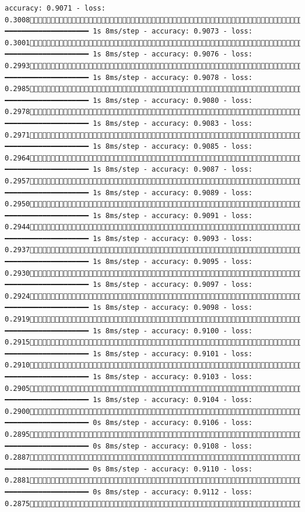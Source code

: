 \documentclass[
  letterpaper,
  DIV=11,
  numbers=noendperiod]{scrreprt}
\begin{document}
\begin{verbatim}
accuracy: 0.9071 - loss: 0.30081642/1875 ━━━━━━━━━━━━━━━━━━━━ 1s 8ms/step - accuracy: 0.9073 - loss: 0.30011650/1875 ━━━━━━━━━━━━━━━━━━━━ 1s 8ms/step - accuracy: 0.9076 - loss: 0.29931658/1875 ━━━━━━━━━━━━━━━━━━━━ 1s 8ms/step - accuracy: 0.9078 - loss: 0.29851665/1875 ━━━━━━━━━━━━━━━━━━━━ 1s 8ms/step - accuracy: 0.9080 - loss: 0.29781673/1875 ━━━━━━━━━━━━━━━━━━━━ 1s 8ms/step - accuracy: 0.9083 - loss: 0.29711680/1875 ━━━━━━━━━━━━━━━━━━━━ 1s 8ms/step - accuracy: 0.9085 - loss: 0.29641687/1875 ━━━━━━━━━━━━━━━━━━━━ 1s 8ms/step - accuracy: 0.9087 - loss: 0.29571694/1875 ━━━━━━━━━━━━━━━━━━━━ 1s 8ms/step - accuracy: 0.9089 - loss: 0.29501701/1875 ━━━━━━━━━━━━━━━━━━━━ 1s 8ms/step - accuracy: 0.9091 - loss: 0.29441708/1875 ━━━━━━━━━━━━━━━━━━━━ 1s 8ms/step - accuracy: 0.9093 - loss: 0.29371715/1875 ━━━━━━━━━━━━━━━━━━━━ 1s 8ms/step - accuracy: 0.9095 - loss: 0.29301722/1875 ━━━━━━━━━━━━━━━━━━━━ 1s 8ms/step - accuracy: 0.9097 - loss: 0.29241727/1875 ━━━━━━━━━━━━━━━━━━━━ 1s 8ms/step - accuracy: 0.9098 - loss: 0.29191732/1875 ━━━━━━━━━━━━━━━━━━━━ 1s 8ms/step - accuracy: 0.9100 - loss: 0.29151737/1875 ━━━━━━━━━━━━━━━━━━━━ 1s 8ms/step - accuracy: 0.9101 - loss: 0.29101742/1875 ━━━━━━━━━━━━━━━━━━━━ 1s 8ms/step - accuracy: 0.9103 - loss: 0.29051748/1875 ━━━━━━━━━━━━━━━━━━━━ 1s 8ms/step - accuracy: 0.9104 - loss: 0.29001754/1875 ━━━━━━━━━━━━━━━━━━━━ 0s 8ms/step - accuracy: 0.9106 - loss: 0.28951762/1875 ━━━━━━━━━━━━━━━━━━━━ 0s 8ms/step - accuracy: 0.9108 - loss: 0.28871769/1875 ━━━━━━━━━━━━━━━━━━━━ 0s 8ms/step - accuracy: 0.9110 - loss: 0.28811776/1875 ━━━━━━━━━━━━━━━━━━━━ 0s 8ms/step - accuracy: 0.9112 - loss: 0.28751783/1875 
\end{verbatim}
\end{document}
